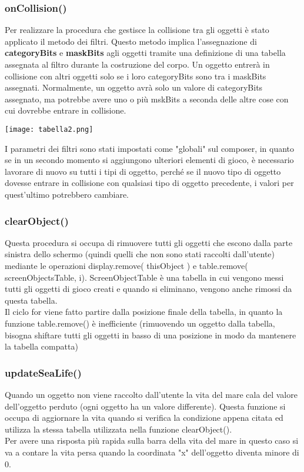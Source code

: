 \documentclass[12pt]{article}
\begin{document}
\subsubsection{onCollision()}
Per realizzare la procedura che gestisce la collisione tra gli oggetti è stato applicato il metodo dei filtri. 
Questo metodo implica l'assegnazione di \textbf{categoryBits} e \textbf{maskBits} agli oggetti tramite una definizione di una 
tabella assegnata al filtro durante la costruzione del corpo. Un oggetto entrerà in collisione con altri oggetti solo se i loro 
categoryBits sono tra i maskBits assegnati. Normalmente, un oggetto avrà solo un valore di categoryBits assegnato, ma potrebbe avere 
uno o più mskBits a seconda delle altre cose con cui dovrebbe entrare in collisione.

\begin{center}
    \texttt{[image: tabella2.png]}\\
\end{center}

I parametri dei filtri sono stati impostati come "globali" sul composer, in quanto se in un secondo momento si aggiungono ulteriori 
elementi di gioco, è necessario lavorare di nuovo su tutti i tipi di oggetto, perché se il nuovo tipo di oggetto dovesse entrare in 
collisione con qualsiasi tipo di oggetto precedente, i valori per quest'ultimo potrebbero cambiare. 


\subsubsection{clearObject()}
Questa procedura si occupa di rimuovere tutti gli oggetti che escono dalla parte sinistra dello schermo (quindi quelli che non sono stati raccolti dall'utente) mediante le operazioni display.remove( thisObject ) e table.remove( screenObjectsTable, i). ScreenObjectTable è una tabella in cui vengono messi tutti gli oggetti di gioco creati e quando si eliminano, vengono anche rimossi da questa tabella. \\
Il ciclo for viene fatto partire dalla posizione finale della tabella, in quanto la funzione table.remove() è inefficiente (rimuovendo un oggetto dalla tabella, bisogna shiftare tutti gli oggetti in basso di una posizione in modo da mantenere la tabella compatta)

\subsubsection{updateSeaLife()}
Quando un oggetto non viene raccolto dall'utente la vita del mare cala del valore dell'oggetto perduto (ogni oggetto ha un valore differente). Questa funzione si occupa di aggiornare la vita quando si verifica la condizione appena citata ed utilizza la stessa tabella utilizzata nella funzione clearObject().\\
Per avere una risposta più rapida sulla barra della vita del mare in questo caso si va a contare la vita persa quando la coordinata "x" dell'oggetto diventa minore di 0.\\
\end{document}

